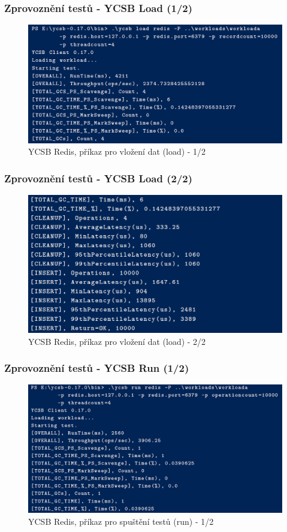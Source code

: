 \documentclass{beamer}
\begin{document}
	\begin{frame}
		\frametitle{Zprovoznění testů - YCSB Load (1/2)}
		\begin{figure}
			\centering
			\includegraphics[scale=0.4]{Figures/ycsb_load_1.PNG}
			\caption{YCSB Redis, příkaz pro vložení dat (load) - 1/2}
		\end{figure}
	\end{frame}

	\begin{frame}
		\frametitle{Zprovoznění testů - YCSB Load (2/2)}
		\begin{figure}
			\centering
			\includegraphics[scale=0.4]{Figures/ycsb_load_2.PNG}
			\caption{YCSB Redis, příkaz pro vložení dat (load) - 2/2}
		\end{figure}
	\end{frame}

	\begin{frame}
		\frametitle{Zprovoznění testů - YCSB Run (1/2)}
		\begin{figure}
			\centering
			\includegraphics[scale=0.35]{Figures/ycsb_run_1.PNG}
			\caption{YCSB Redis, příkaz pro spuštění testů (run) - 1/2}
		\end{figure}
	\end{frame}
\end{document}
